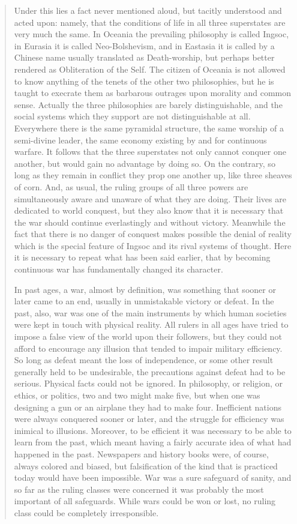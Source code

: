 \begin{quotation}
Under this lies a fact never mentioned aloud, but tacitly understood and
acted upon: namely, that the conditions of life in all three superstates
are very much the same. In Oceania the prevailing philosophy is called
Ingsoc, in Eurasia it is called Neo-Bolshevism, and in Eastasia it is
called by a Chinese name usually translated as Death-worship, but
perhaps better rendered as Obliteration of the Self. The citizen of
Oceania is not allowed to know anything of the tenets of the other two
philosophies, but he is taught to execrate them as barbarous outrages
upon morality and common sense. Actually the three philosophies are
barely distinguishable, and the social systems which they support are
not distinguishable at all. Everywhere there is the same pyramidal
structure, the same worship of a semi-divine leader, the same economy
existing by and for continuous warfare. It follows that the three
superstates not only cannot conquer one another, but would gain no
advantage by doing so. On the contrary, so long as they remain in
conflict they prop one another up, like three sheaves of corn. And, as
usual, the ruling groups of all three powers are simultaneously aware
and unaware of what they are doing. Their lives are dedicated to world
conquest, but they also know that it is necessary that the war should
continue everlastingly and without victory. Meanwhile the fact that
there is no danger of conquest makes possible the denial of reality
which is the special feature of Ingsoc and its rival systems of thought.
Here it is necessary to repeat what has been said earlier, that by
becoming continuous war has fundamentally changed its character.

In past ages, a war, almost by definition, was something that sooner or
later came to an end, usually in unmistakable victory or defeat. In the
past, also, war was one of the main instruments by which human societies
were kept in touch with physical reality. All rulers in all ages have
tried to impose a false view of the world upon their followers, but they
could not afford to encourage any illusion that tended to impair
military efficiency. So long as defeat meant the loss of independence,
or some other result generally held to be undesirable, the precautions
against defeat had to be serious. Physical facts could not be ignored.
In philosophy, or religion, or ethics, or politics, two and two might
make five, but when one was designing a gun or an airplane they had to
make four. Inefficient nations were always conquered sooner or later,
and the struggle for efficiency was inimical to illusions. Moreover, to
be efficient it was necessary to be able to learn from the past, which
meant having a fairly accurate idea of what had happened in the past.
Newspapers and history books were, of course, always colored and biased,
but falsification of the kind that is practiced today would have been
impossible. War was a sure safeguard of sanity, and so far as the ruling
classes were concerned it was probably the most important of all
safeguards. While wars could be won or lost, no ruling class could be
completely irresponsible.


\end{quotation}
